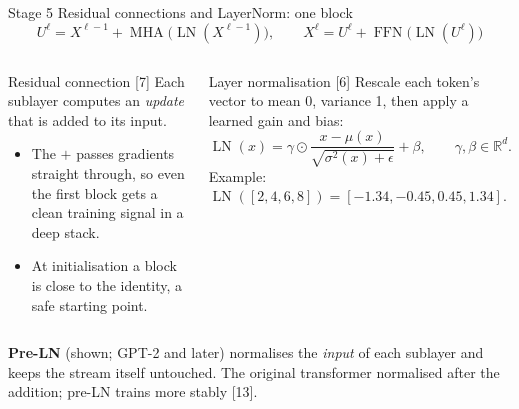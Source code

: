 \documentclass[aspectratio=169,10pt]{beamer}
\newcommand{\R}{\mathbb{R}}
\DeclareMathOperator{\LN}{LN}
\DeclareMathOperator{\MHA}{MHA}
\DeclareMathOperator{\FFN}{FFN}
\renewcommand{\cite}[1]{{\scriptsize\color{cTok}[#1]}}
\newcommand{\key}[1]{\textbf{\color{cAtt}#1}}
\begin{document}
\begin{frame}{Stage 5 \textbullet{} Residual connections and LayerNorm: one block}
\vspace{-1mm}
\[
  U^{\ell}=X^{\ell-1}+\MHA\bigl(\LN(X^{\ell-1})\bigr),\qquad
  X^{\ell}=U^{\ell}+\FFN\bigl(\LN(U^{\ell})\bigr)
\]
\vspace{-3mm}
\begin{columns}[T,onlytextwidth]
\begin{block}{Residual connection \cite{7}}
\footnotesize
Each sublayer computes an \emph{update} that is added to its input.
\begin{itemize}
  \item The $+$ passes gradients straight through, so even the first block gets a clean
        training signal in a deep stack.
  \item At initialisation a block is close to the identity, a safe starting point.
\end{itemize}
\end{block}
\begin{block}{Layer normalisation \cite{6}}
\footnotesize
Rescale each token's vector to mean 0, variance 1, then apply a learned gain and bias:
\[
  \LN(x)=\gamma\odot\frac{x-\mu(x)}{\sqrt{\sigma^2(x)+\epsilon}}+\beta,\qquad \gamma,\beta\in\R^{d}.
\]
Example: $\LN([2,4,6,8])=[-1.34,-0.45,0.45,1.34]$.
\end{block}
\end{columns}
\vspace{0.5mm}
{\footnotesize \key{Pre-LN} (shown; GPT-2 and later) normalises the \emph{input} of each sublayer and keeps the
stream itself untouched. The original transformer normalised after the addition; pre-LN trains more stably \cite{13}.}
\end{frame}
\end{document}
